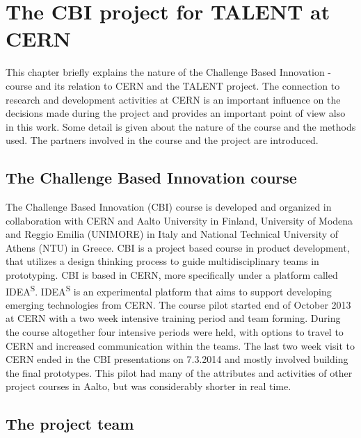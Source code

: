 \documentclass[english,12pt,a4paper,dvips]{article}
\begin{document}


\section{The CBI project for TALENT at CERN}

This chapter briefly explains the nature of the Challenge Based Innovation -course and its relation to CERN and the TALENT project. The connection to research and development activities at CERN is an important influence on the decisions made during the project and provides an important point of view also in this work. Some detail is given about the nature of the course and the methods used. The partners involved in the course and the project are introduced. 


\subsection{The Challenge Based Innovation course}

The Challenge Based Innovation (CBI) course is developed and organized in collaboration with CERN and Aalto University in Finland, University of Modena and Reggio Emilia (UNIMORE) in Italy and National Technical University of Athens (NTU) in Greece. CBI is a project based course in product development, that utilizes a design thinking process to guide multidisciplinary teams in prototyping. CBI is based in CERN, more specifically under a platform called IDEA\textsuperscript{S}. IDEA\textsuperscript{S} is an experimental platform that aims to support developing emerging technologies from CERN. The course pilot started end of October 2013 at CERN with a two week intensive training period and team forming. During the course altogether four intensive periods were held, with options to travel to CERN and increased communication within the teams. The last two week visit to CERN ended in the CBI presentations on 7.3.2014 and mostly involved building the final prototypes. This pilot had many of the attributes and activities of other project courses in Aalto, but was considerably shorter in real time.

\subsection{The project team}
\end{document}
